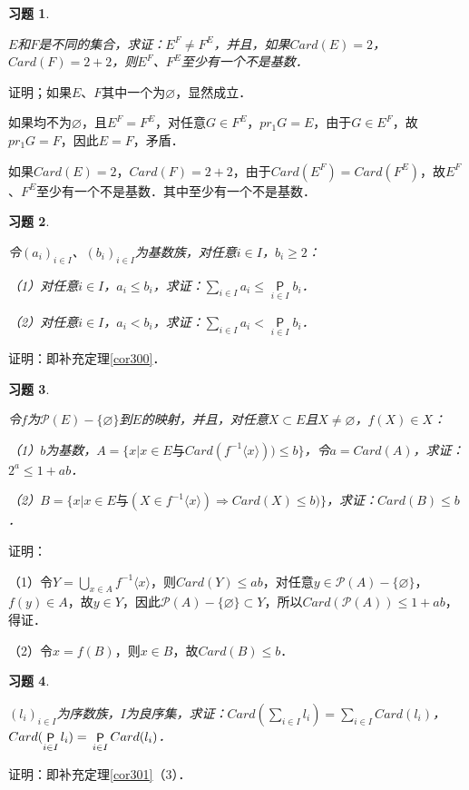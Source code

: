 \documentclass[12pt, a4paper, oneside]{book}
\newtheorem{exer}{习题}
\begin{document}
			\begin{exer}\label{exer122}
				\hfill\par
				$E$和$F$是不同的集合，求证：$E^F\neq F^E$，并且，如果$Card(E)=2$，$Card(F)=2+2$，则$E^F$、$F^E$至少有一个不是基数．
			\end{exer}
			证明；如果$E$、$F$其中一个为$\varnothing$，显然成立．
			\par
			如果均不为$\varnothing$，且$E^F=F^E$，对任意$G\in F^E$，$pr_1G=E$，由于$G\in E^F$，故$pr_1G=F$，因此$E=F$，矛盾．
			\par
			如果$Card(E)=2$，$Card(F)=2+2$，由于$Card(E^F)=Card(F^E)$，故$E^F$、$F^E$至少有一个不是基数．其中至少有一个不是基数．
			
			\begin{exer}\label{exer123}
				\hfill\par
				令$(a_i)_{i\in I}$、$(b_i)_{i\in I}$为基数族，对任意$i\in I$，$b_i\geq 2$：
				\par
				（1）对任意$i\in I$，$a_i\leq b_i$，求证：$\sum\limits_{i\in I}a_i\leq \mathop{\mathsf{P}}\limits_{i\in I}b_i$．
				\par
				（2）对任意$i\in I$，$a_i<b_i$，求证：$\sum\limits_{i\in I}a_i<\mathop{\mathsf{P}}\limits_{i\in I}b_i$．
			\end{exer}
			证明：即补充定理\ref{cor300}．
			
			\begin{exer}\label{exer124}
				\hfill\par
				令$f$为$\mathcal{P}(E)-\{\varnothing\}$到$E$的映射，并且，对任意$X\subset E$且$X\neq \varnothing$，$f(X)\in X$：
				\par
				（1）$b$为基数，$A=\{x|x\in E\text{与}Card(f^{-1}\langle x\rangle))\leq b\}$，令$a=Card(A)$，求证：$2^a\leq 1+ab$．
				\par
				（2）$B=\{x|x\in E\text{与}(X\in f^{-1}\langle x\rangle)\Rightarrow Card(X) \leq b)\}$，求证：$Card(B)\leq b$．
			\end{exer}
			证明：
			\par
			（1）令$Y=\bigcup\limits_{x\in A}f^{-1}\langle x\rangle$，则$Card(Y)\leq ab$，对任意$y\in \mathcal{P}(A)-\{\varnothing\}$，$f(y)\in A$，故$y\in Y$，因此$\mathcal{P}(A)-\{\varnothing\}\subset Y$，所以$Card(\mathcal{P}(A))\leq 1+ab$，得证．
			\par
			（2）令$x=f(B)$，则$x\in B$，故$Card(B)\leq b$．
			
			\begin{exer}\label{exer125}
				\hfill\par
				$(l_i)_{i\in I}$为序数族，$I$为良序集，求证：$Card(\sum\limits_{i\in I}l_i)= \sum\limits_{i\in I}Card(l_i)$，$Card(\mathop{\mathsf{P}}\limits_{i\in I}l_i)=\\\mathop{\mathsf{P}}\limits_{i\in I}Card(l_i)$．
			\end{exer}
			证明：即补充定理\ref{cor301}（3）．
			
\end{document}
